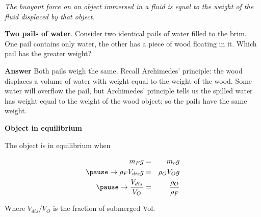 \documentclass[]{beamer}
\begin{document}

\begin{frame}

    
  
  \textit{\textcolor{mypink1}{The buoyant force on an object immersed in
   a fluid is equal to the weight of the fluid displaced by that object.}}
    
    
\end{frame}




\begin{frame}
\textbf{Two pails of water}. Consider two identical pails of water filled to the brim. One pail contains only water, the other has a piece of wood floating in it. Which pail has the greater weight?

\vspace{3mm}

\pause
\textcolor{mypink1}{\textbf{Answer}  Both pails weigh the same. Recall Archimedes’ principle: the wood
displaces a volume of water with weight equal to the weight of the wood.
Some water will overflow the pail, but Archimedes’ principle tells us the
spilled water has weight equal to the weight of the wood object; so the pails have
the same weight.}
  \end{frame}




\begin{frame}


\textbf{Object in equilibrium} 

\vspace{3mm}
The object is in equilibrium when


   \begin{eqnarray*}
    m_Fg&=&m_og\\
    \pause
    \rightarrow \rho_FV_{dis}g&=&\rho_OV_Og\\
    \pause
    \rightarrow \frac{V_{dis}}{V_{O}}&=&\frac{ \rho_O}{\rho_{F } }
    \end{eqnarray*}
    
    Where $V_{dis}/V_{O}$ is  the fraction of submerged Vol.
    

  \end{frame}
\end{document}
